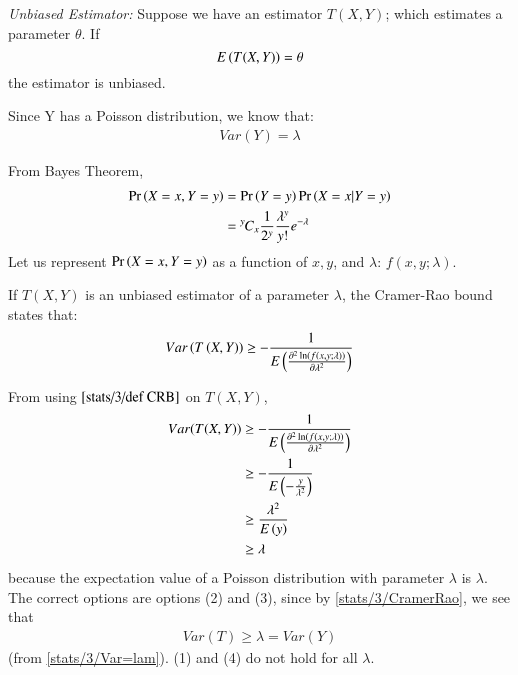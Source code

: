\begin{definition}
    {\em Unbiased Estimator: } Suppose we have an estimator $T(X, Y)$; which estimates a parameter $\theta$.  If
    \begin{equation}
        E\left(T(X, Y)\right)=\theta
    \end{equation}
    the estimator is unbiased. 
    \end{definition}
    \begin{lemma}
    Since Y has a Poisson distribution, we know that:
    \begin{align}\label{stats/3/Var=lam}
    Var(Y)=\lambda
    \end{align}
    \end{lemma}
    From Bayes Theorem,
    \begin{align}
        \Pr\left(X=x,Y=y\right)&=\Pr\left(Y=y\right)  \Pr\left(X=x|Y=y\right)\\
        &= {{}^{y}\mkern-1muC_{x}} \frac{1}{2^y} \frac{\lambda^y}{y!} e^{- \lambda}
    \end{align}
    Let us represent $ \Pr\left(X=x,Y=y\right)$ as a function of $x, y$, and $\lambda$: $f(x, y;\lambda)$.
    \begin{definition} 
    If $T(X, Y)$ is an unbiased estimator of a parameter $\lambda$, the Cramer-Rao bound states that:
    \begin{align}
        Var\left(T\left(X,Y\right)\right)\geq -\frac{1}{E\left(\frac{\partial^2 \ln(f(x,y;\lambda))}{\partial\lambda^2}\right)} \label{stats/3/def CRB}
    \end{align}
    \end{definition}
    From using $\eqref{stats/3/def CRB}$ on $T(X,Y)$,
    \begin{align}
        Var(T(X, Y))&\geq -\frac{1}{E\left(\frac{\partial^2 \ln(f(x,y;\lambda))}{\partial\lambda^2}\right)}\\
        &\geq-\frac{1}{E\left(-\frac{y}{\lambda^2}\right)}\\
        &\geq\frac{\lambda^2}{E\left(y\right)}\\
        &\geq \lambda \label{stats/3/CramerRao}
    \end{align}
    because the expectation value of a Poisson distribution with parameter $\lambda$ is $\lambda$.
    The correct options are options (2) and (3), since by \eqref{stats/3/CramerRao}, we see that 
    \begin{align*}
    Var(T) \geq \lambda=Var(Y)
    \end{align*}
    (from \eqref{stats/3/Var=lam}). (1) and (4) do not hold for all $\lambda$.
    